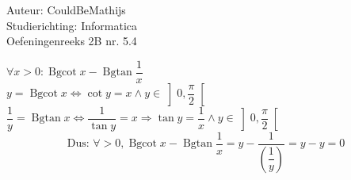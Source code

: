 \documentclass[a4paper]{article}
\newcommand{\Bgcot}{\operatorname{Bgcot}}
\newcommand{\Bgtan}{\operatorname{Bgtan}}
\begin{document}
  
\noindent \large Auteur: CouldBeMathijs \\
\noindent \large Studierichting: Informatica\\
\noindent \large Oefeningenreeks 2B nr. 5.4\\

\medskip

\normalsize

$\forall x > 0: \Bgcot x - \Bgtan \dfrac{1}{x}$\\

$y = \Bgcot x \Leftrightarrow \cot y = x \wedge y \in \left] 0, \dfrac{\pi}{2} \right[ $\\

$\dfrac{1}{y} = \Bgtan x \Leftrightarrow \dfrac{1}{\tan y} = x \Rightarrow \tan y = \dfrac{1}{x} \wedge y \in \left] 0, \dfrac{\pi}{2}\right[$\\

$$\text{Dus: }\forall > 0, \Bgcot x - \Bgtan \dfrac{1}{x} = y - \dfrac{1}{\left( \dfrac{1}{y}\right)} = y - y = 0$$
\begin{thebibliography}{999}
\end{thebibliography}
\end{document}

